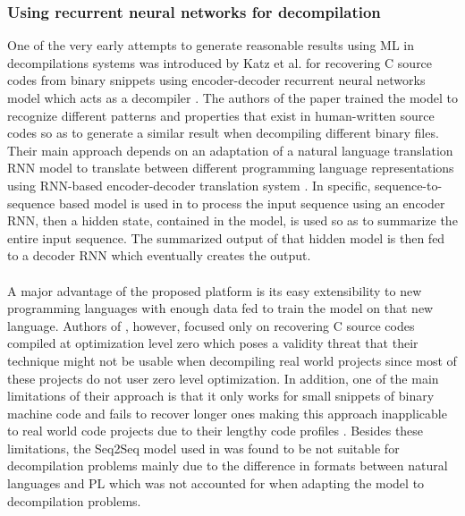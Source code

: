 \documentclass[conference,a4paper]{IEEEtran}
\begin{document}
\subsubsection{Using recurrent neural networks for decompilation}
\noindent One of the very early attempts to generate reasonable results using ML in decompilations systems was introduced by Katz et al. for recovering C source codes from binary snippets using encoder-decoder recurrent neural networks model which acts as a decompiler \cite{katz_using_2018}.
The authors of the paper trained the model to recognize different patterns and properties that exist in human-written source codes so as to generate a similar result when decompiling different binary files.
Their main approach depends on an adaptation of a natural language translation RNN model to translate between different programming language representations using RNN-based encoder-decoder translation system \cite{katz_using_2018}.
In specific, sequence-to-sequence based model is used in \cite{katz_using_2018} to process the input sequence using an encoder RNN, then a hidden state, contained in the model, is used so as to summarize the entire input sequence.
The summarized output of that hidden model is then fed to a decoder RNN which eventually creates the output. \\\\
A major advantage of the proposed platform is its easy extensibility to new programming languages with enough data fed to train the model on that new language.
Authors of \cite{katz_using_2018}, however, focused only on recovering C source codes compiled at optimization level zero which poses a validity threat that their technique might not be usable when decompiling real world projects since most of these projects do not user zero level optimization.
In addition, one of the main limitations of their approach is that it only works for small snippets of binary machine code and fails to recover longer ones making this approach inapplicable to real world code projects due to their lengthy code profiles \cite{katz_using_2018}.
Besides these limitations, the Seq2Seq model used in \cite{katz_using_2018} was found to be not suitable for decompilation problems mainly due to the difference in formats between natural languages and PL which was not accounted for when adapting the model to decompilation problems.\\\\
\end{document}
